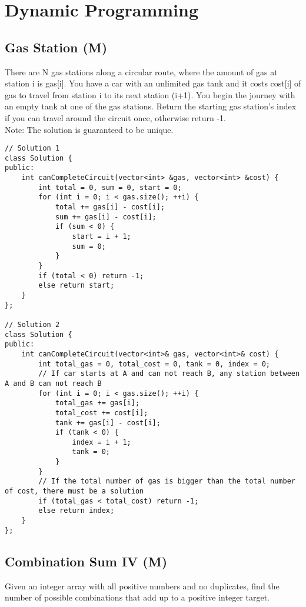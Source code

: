 \chapter{Dynamic Programming}
\section{Gas Station (M)}
There are N gas stations along a circular route, where the amount of gas at station i is gas[i]. You have a car with an unlimited gas tank and it costs cost[i] of gas to travel from station i to its next station (i+1). You begin the journey with an empty tank at one of the gas stations. Return the starting gas station's index if you can travel around the circuit once, otherwise return -1.\\

Note:
The solution is guaranteed to be unique. \\

\begin{lstlisting}
// Solution 1
class Solution {
public:
    int canCompleteCircuit(vector<int> &gas, vector<int> &cost) {
        int total = 0, sum = 0, start = 0;
        for (int i = 0; i < gas.size(); ++i) {
            total += gas[i] - cost[i];
            sum += gas[i] - cost[i];
            if (sum < 0) {
                start = i + 1;
                sum = 0;
            }
        }
        if (total < 0) return -1;
        else return start;
    }
};

// Solution 2
class Solution {
public:
    int canCompleteCircuit(vector<int>& gas, vector<int>& cost) {
        int total_gas = 0, total_cost = 0, tank = 0, index = 0;
        // If car starts at A and can not reach B, any station between A and B can not reach B
        for (int i = 0; i < gas.size(); ++i) {  
            total_gas += gas[i];                
            total_cost += cost[i];
            tank += gas[i] - cost[i];
            if (tank < 0) {
                index = i + 1;
                tank = 0;
            }
        }
        // If the total number of gas is bigger than the total number of cost, there must be a solution
        if (total_gas < total_cost) return -1;                  
        else return index;
    }
};
\end{lstlisting}


\section{Combination Sum IV (M)}
Given an integer array with all positive numbers and no duplicates, find the number of possible combinations that add up to a positive integer target.\\

